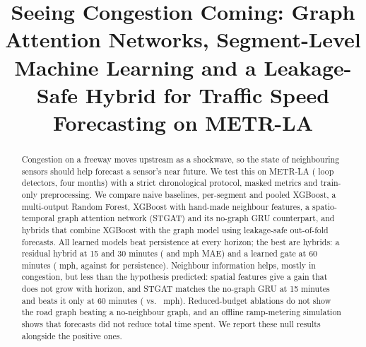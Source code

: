 \documentclass[conference]{IEEEtran}
\begin{document}
\title{Seeing Congestion Coming: Graph Attention Networks, Segment-Level Machine Learning and a Leakage-Safe Hybrid for Traffic Speed Forecasting on METR-LA}
\author{}
\maketitle

\begin{abstract}
Congestion on a freeway moves upstream as a shockwave, so the state of neighbouring sensors should help forecast a sensor's near future.
We test this on METR-LA (\graphNodes{} loop detectors, four months) with a strict chronological protocol, masked metrics and train-only preprocessing.
We compare naive baselines, per-segment and pooled XGBoost, a multi-output Random Forest, XGBoost with hand-made neighbour features, a spatio-temporal graph attention network (STGAT) and its no-graph GRU counterpart, and hybrids that combine XGBoost with the graph model using leakage-safe out-of-fold forecasts.
All learned models beat persistence at every horizon; the best are hybrids: a residual hybrid at 15 and 30 minutes (\maeHybridResidualFifteen{} and \maeHybridResidualThirty{} mph MAE) and a learned gate at 60 minutes (\maeHybridGatingSixty{} mph, against \maePersistenceSixty{} for persistence).
Neighbour information helps, mostly in congestion, but less than the hypothesis predicted: spatial features give a gain that does not grow with horizon, and STGAT matches the no-graph GRU at 15 minutes and beats it only at 60 minutes (\maeStgatSixty{} vs.\ \maeGruNographSixty{} mph).
Reduced-budget ablations do not show the road graph beating a no-neighbour graph, and an offline ramp-metering simulation shows that forecasts did not reduce total time spent.
We report these null results alongside the positive ones.
\end{abstract}
\end{document}
